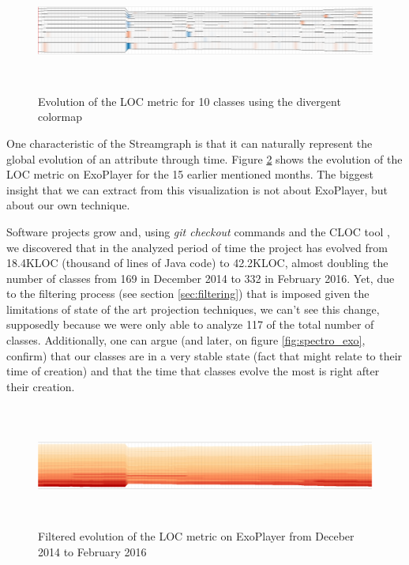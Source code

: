 \begin{figure}[H]
	\centering
	\includegraphics[width=1.0\textwidth,height=4.0cm]{figures/stream_10_loc_div.png}
	\caption{Evolution of the LOC metric for 10 classes using the divergent colormap}
	\label{fig:stream_10_loc_div}
\end{figure}

One characteristic of the Streamgraph is that it can naturally represent the global evolution of an attribute through time. Figure \ref{fig:stream_all_loc} shows the evolution of the LOC metric on ExoPlayer for the 15 earlier mentioned months. The biggest insight that we can extract from this visualization is not about ExoPlayer, but about our own technique.

Software projects grow and, using \textit{git checkout} commands and the CLOC tool %
, we discovered that in the analyzed period of time the project has evolved from 18.4KLOC (thousand of lines of Java code) to 42.2KLOC, almost doubling the number of classes from 169 in December 2014 to 332 in February 2016. Yet, due to the filtering process (see section \ref{sec:filtering}) that is imposed given the limitations of state of the art projection techniques, we can't see this change, supposedly because we were only able to analyze 117 of the total number of classes. Additionally, one can argue (and later, on figure \ref{fig:spectro_exo}, confirm) that our classes are in a very stable state (fact that might relate to their time of creation) and that the time that classes evolve the most is right after their creation.

\begin{figure}[H]
  \centering
  \includegraphics[width=1.0\textwidth,height=4.0cm]{figures/stream_all_loc.png}
  \caption{Filtered evolution of the LOC metric on ExoPlayer from Deceber 2014 to February 2016}
  \label{fig:stream_all_loc}
\end{figure}

